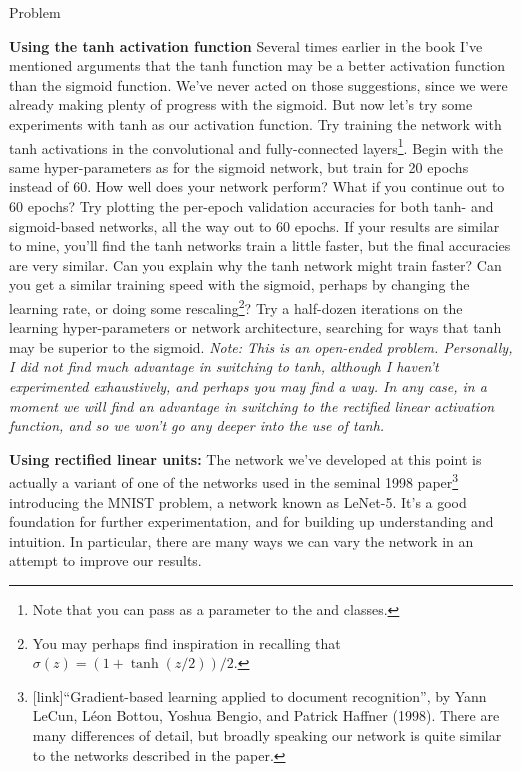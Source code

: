 \documentclass[a4paper,twoside,10pt]{book}
\begin{document}
\begin{exercize}{Problem}
	\item \textbf{Using the tanh activation function} Several times earlier in the book I've mentioned arguments that the tanh function may be a better activation function than the sigmoid function. We've never acted on those suggestions, since we were already making plenty of progress with the sigmoid. But now let's try some experiments with tanh as our activation function. Try training the network with tanh activations in the convolutional and fully-connected layers\footnote{Note that you can pass  as a parameter to the  and  classes.}. Begin with the same hyper-parameters as for the sigmoid network, but train for 20 epochs instead of 60. How well does your network perform? What if you continue out to 60 epochs? Try plotting the per-epoch validation accuracies for both tanh- and sigmoid-based networks, all the way out to 60 epochs. If your results are similar to mine, you'll find the tanh networks train a little faster, but the final accuracies are very similar. Can you explain why the tanh network might train faster? Can you get a similar training speed with the sigmoid, perhaps by changing the learning rate, or doing some rescaling\footnote{You may perhaps find inspiration in recalling that $\sigma(z) = (1+\tanh(z/2))/2$.}? Try a half-dozen iterations on the learning hyper-parameters or network architecture, searching for ways that tanh may be superior to the sigmoid. \textit{Note: This is an open-ended problem. Personally, I did not find much advantage in switching to tanh, although I haven't experimented exhaustively, and perhaps you may find a way. In any case, in a moment we will find an advantage in switching to the rectified linear activation function, and so we won't go any deeper into the use of tanh.}
\end{exercize}
\textbf{Using rectified linear units:} The network we've developed at this point is actually a variant of one of the networks used in the seminal 1998 paper\footnote{[link]``Gradient-based learning applied to document recognition'', by Yann LeCun, L\'eon Bottou, Yoshua Bengio, and Patrick Haffner (1998). There are many differences of detail, but broadly speaking our network is quite similar to the networks described in the paper.} introducing the MNIST problem, a network known as LeNet-5. It's a good foundation for further experimentation, and for building up understanding and intuition. In particular, there are many ways we can vary the network in an attempt to improve our results.
\end{document}
